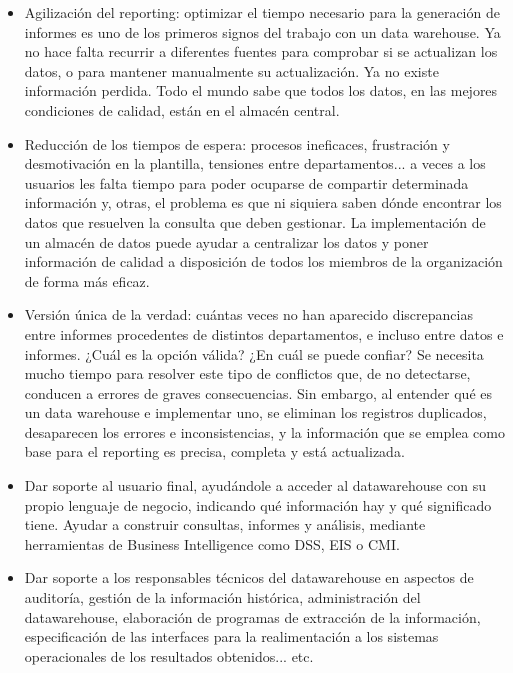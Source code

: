 \documentclass[11pt,a4paper]{article}
\begin{document}
				\begin{itemize}
					\item Agilización del reporting: optimizar el tiempo necesario para la generación de informes es uno de los primeros signos del trabajo con un data warehouse. Ya no hace falta recurrir a diferentes fuentes para comprobar si se actualizan los datos, o para mantener manualmente su actualización. Ya no existe información perdida. Todo el mundo sabe que todos los datos, en las mejores condiciones de calidad, están en el almacén central.
					
					\item Reducción de los tiempos de espera: procesos ineficaces, frustración y desmotivación en la plantilla, tensiones entre departamentos...  a veces a los usuarios les falta tiempo para poder ocuparse de compartir determinada información y, otras, el problema es que ni siquiera saben dónde encontrar los datos que resuelven la consulta que deben gestionar. La implementación de un almacén de datos puede ayudar a centralizar los datos y poner información de calidad a disposición de todos los miembros de la organización de forma más eficaz.
					
					\item Versión única de la verdad: cuántas veces no han aparecido discrepancias entre informes procedentes de distintos departamentos, e incluso entre datos e informes. ¿Cuál es la opción válida? ¿En cuál se puede confiar? Se necesita mucho tiempo para resolver este tipo de conflictos que, de no detectarse, conducen a errores de graves consecuencias. Sin embargo, al entender qué es un data warehouse e implementar uno, se eliminan los registros duplicados, desaparecen los errores e inconsistencias, y la información que se emplea como base para el reporting es precisa, completa y está actualizada.
					
					\item Dar soporte al usuario final, ayudándole a acceder al datawarehouse con su propio lenguaje de negocio, indicando qué información hay y qué significado tiene. Ayudar a construir consultas, informes y análisis, mediante herramientas de Business Intelligence como DSS, EIS o CMI.
					
					\item Dar soporte a los responsables técnicos del datawarehouse en aspectos de auditoría, gestión de la información histórica, administración del datawarehouse, elaboración de programas de extracción de la información, especificación de las interfaces para la realimentación a los sistemas operacionales de los resultados obtenidos... etc.
					

\end{itemize}
\end{document}

